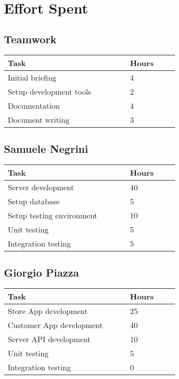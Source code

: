 \chapter{Effort Spent}

\section{Teamwork}
\vspace{2mm}
\begin{center}
    \begin{tabular}{@{}p{0.5\linewidth} p{0.2\linewidth}@{}}
        \hline
        \textbf{Task} & \textbf{Hours} \\ \hline
        Initial briefing & 4 \\ \hline
		Setup development tools & 2 \\ \hline
		Documentation & 4 \\ \hline
		Document writing & 3 \\ \hline
    \end{tabular}
\end{center}

\section{Samuele Negrini}
\vspace{2mm}
\begin{center}
	\begin{tabular}{@{}p{0.5\linewidth} p{0.2\linewidth}@{}}
		\hline
		\textbf{Task} & \textbf{Hours} \\ \hline
		Server development & 40 \\ \hline
		Setup database & 5 \\ \hline
		Setup testing environment & 10 \\ \hline
		Unit testing & 5 \\ \hline
		Integration testing & 5 \\ \hline
	\end{tabular}
\end{center}

\section{Giorgio Piazza}
\vspace{2mm}
\begin{center}
	\begin{tabular}{@{}p{0.5\linewidth} p{0.2\linewidth}@{}}
		\hline
		\textbf{Task} & \textbf{Hours} \\ \hline
		Store App development & 25 \\ \hline
		Customer App development & 40 \\ \hline
	    Server API development  & 10 \\ \hline
	    Unit testing & 5 \\ \hline
	    Integration testing & 0 \\ \hline
	\end{tabular}
\end{center}